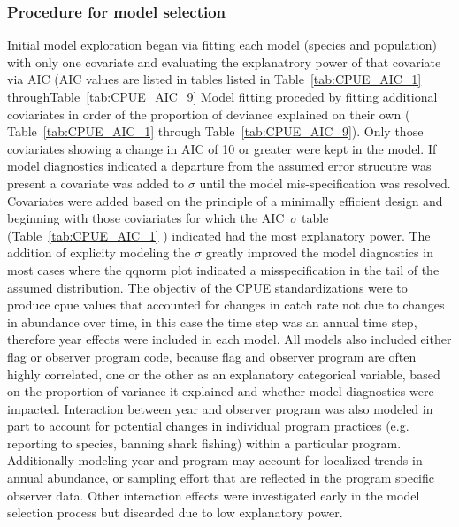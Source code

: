 \subsubsection{Procedure for model selection}
Initial model exploration began via fitting each model (species and population) with only one covariate and evaluating the explanatrory power of that covariate via AIC  (AIC values are listed in tables  listed in Table~\ref{tab:CPUE_AIC_1} throughTable~\ref{tab:CPUE_AIC_9} %
Model fitting proceded by fitting additional coviariates in order of the proportion of deviance explained  on their own ( Table~\ref{tab:CPUE_AIC_1} through Table~\ref{tab:CPUE_AIC_9}).  Only those coviariates showing a change in AIC of 10 or greater were kept in the model.
If model diagnostics indicated a departure from the assumed error strucutre was present a covariate was added to $\sigma$ until the model mis-specification was resolved. Covariates were added based on the principle of a minimally efficient design and beginning with those coviariates for which the AIC~$\sigma$ table (Table~\ref{tab:CPUE_AIC_1} ) indicated had the most explanatory power.  
The addition of explicity modeling the $\sigma$ greatly improved the  model diagnostics in  most cases where the qqnorm plot indicated a misspecification in the tail of the assumed distribution.  The objectiv of the CPUE standardizations were to produce cpue values that accounted for changes in catch rate not due to changes in abundance over time, in this case the time step was an annual time step, therefore year effects were included in each model. 
All models also included either flag or observer program code, because flag and observer program are often highly correlated, one or the other as an explanatory categorical variable, based on the proportion of variance it explained and whether model diagnostics were impacted.
Interaction between year and observer program was also modeled in part to account for potential changes in individual program practices (e.g. reporting to species, banning shark fishing) within a particular program.  Additionally modeling year and program may account for localized trends in annual abundance, or sampling effort that are reflected in the program specific observer data. Other interaction effects were investigated early in the model selection process but discarded due to low explanatory power.%
                                                                                    
